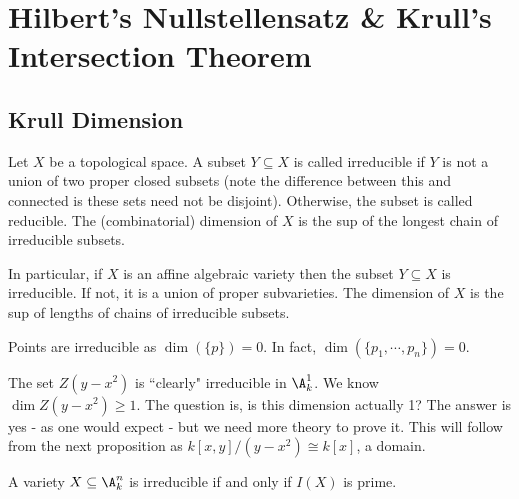
\newpage
\section{Hilbert's Nullstellensatz \& Krull's Intersection Theorem}

\subsection{Krull Dimension}

\begin{dfn}
Let $X$ be a topological space. A subset $Y \subseteq X$ is called irreducible if $Y$ is not a union of two proper closed subsets (note the difference between this and connected is these sets need not be disjoint). Otherwise, the subset is called reducible. The (combinatorial) dimension of $X$ is the sup of the longest chain of irreducible subsets. 
\end{dfn}

In particular, if $X$ is an affine algebraic variety then the subset $Y \subseteq X$ is irreducible. If not, it is a union of proper subvarieties. The dimension of $X$ is the sup of lengths of chains of irreducible subsets. 

\begin{ex}
Points are irreducible as $\dim(\{p\})=0$. In fact, $\dim(\{p_1,\cdots,p_n\})=0$.
\end{ex}

\begin{ex}
The set $Z(y-x^2)$ is ``clearly" irreducible in $\A_k^1$. We know $\dim Z(y-x^2) \geq 1$. The question is, is this dimension actually 1? The answer is yes - as one would expect - but we need more theory to prove it. This will follow from the next proposition as $k[x,y]/(y-x^2) \cong k[x]$, a domain.
\end{ex}

\begin{prop}
A variety $X \subseteq \A_k^n$ is irreducible if and only if $I(X)$ is prime. 
\end{prop}

